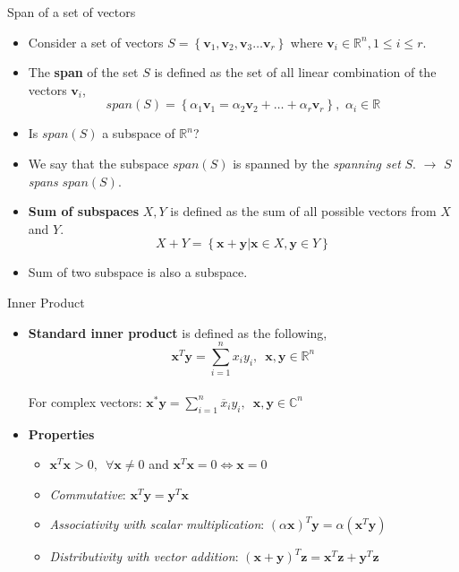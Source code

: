 \documentclass[aspectratio=169]{beamer}
\let\olditem\item
\renewcommand{\item}{\setlength{\itemsep}{\fill}\olditem}
\begin{document}
\begin{frame}[t]{Span of a set of vectors}
\begin{itemize}
    \item Consider a set of vectors $S = \left\{\mathbf{v}_1, \mathbf{v}_2, \mathbf{v}_3 \ldots \mathbf{v}_r\right\}$ where $\mathbf{v}_i \in \mathbb{R}^n, 1 \leq i \leq r$.
    \item The \textbf{span} of the set $S$ is defined as the set of all linear combination of the vectors $\mathbf{v}_i$,
    \[ span\left(S\right) = \left\{\alpha_1\mathbf{v}_1 = \alpha_2\mathbf{v}_2 + \ldots + \alpha_r\mathbf{v}_r\right\}, \,\, \alpha_i \in \mathbb{R} \]
    \item Is $span\left(S\right)$ a subspace of $\mathbb{R}^n$?
    \item We say that the subspace $span\left(S\right)$ is spanned by the \textit{spanning set} $S$. $\longrightarrow$ $S$ \textit{spans} $span\left(S\right)$.
    \item \textbf{Sum of subspaces} $X, Y$ is defined as the sum of all possible vectors from $X$ and $Y$.
    \[ X + Y = \left\{\mathbf{x} + \mathbf{y} \left|\right. \mathbf{x} \in X, \mathbf{y} \in Y\right\} \]
    \item Sum of two subspace is also a subspace.
\end{itemize}
\end{frame}


\begin{frame}[t]{Inner Product}
\begin{itemize}
    \item \textbf{Standard inner product} is defined as the following,
    $$\mathbf{x}^T\mathbf{y} = \sum_{i=1}^{n}x_iy_i, \,\,\, \mathbf{x}, \mathbf{y} \in \mathbb{R}^n$$\\
    For complex vectors:  $\mathbf{x}^{*}\mathbf{y} = \sum_{i=1}^{n}\overline{x}_iy_i, \,\,\, \mathbf{x}, \mathbf{y} \in \mathbb{C}^n$
    \item \textbf{Properties}
    \begin{itemize}
        \item $\mathbf{x}^T\mathbf{x} > 0, \,\,\, \forall \mathbf{x} \neq 0$ and $\mathbf{x}^T\mathbf{x} = 0 \Leftrightarrow \mathbf{x} = 0$
        \item \textit{Commutative}: $\mathbf{x}^T\mathbf{y} = \mathbf{y}^T\mathbf{x}$
        \item \textit{Associativity with scalar multiplication}: $\left(\alpha \mathbf{x}\right)^T\mathbf{y} = \alpha \left(\mathbf{x}^T\mathbf{y}\right)$
        \item \textit{Distributivity with vector addition}: $\left(\mathbf{x} + \mathbf{y}\right)^T\mathbf{z} = \mathbf{x}^T\mathbf{z} + \mathbf{y}^T\mathbf{z}$
    \end{itemize}
\end{itemize}
\end{frame}
\end{document}
